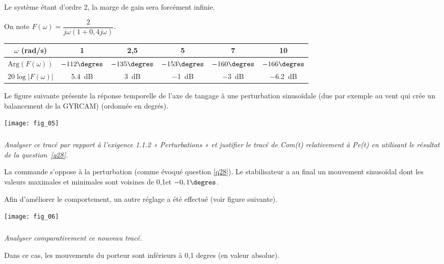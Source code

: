 \begin{multicols}{2}
\begin{corrige}
Le système étant d'ordre 2, la marge de gain sera forcément infinie.
\end{corrige}
\else

\footnotesize
On note $F(\omega)= \dfrac{2}{j\omega \left(1+0,4 j\omega \right)}$.
\begin{center}
\begin{tabular}{|c|c|c|c|c|c|}
\hline
$\omega$ (rad/s) & 1 & 2,5 & 5 & 7 & 10 \\ \hline
$\text{Arg}\left(F(\omega)\right)$  & $-112\degres$ & $-135\degres$ & $-153\degres$ & $-160\degres$ & $-166\degres$ \\ \hline
$20 \log \left| F(\omega)\right|$ & \SI{5,4}{dB} & \SI{3}{dB} & \SI{-1}{dB} & \SI{-3}{dB} & \SI{-6,2}{dB} \\ \hline
\end{tabular}
\end{center}
\normalsize

\fi

\ifprof
\else
Le figure suivante présente la réponse temporelle de l’axe de tangage à une perturbation sinusoïdale (due par
exemple au vent qui crée un balancement de la GYRCAM) (ordonnée en degrés).

\begin{center}
\texttt{[image: fig\_05]}
\end{center}
\fi

\subparagraph{}
\textit{Analyser ce tracé par rapport à l’exigence 1.1.2 « Perturbations » et justifier le
tracé de Com(t) relativement à Pe(t) en utilisant le résultat de la question~\ref{q28}.}
\ifprof
\begin{corrige}
La commande s'oppose à la perturbation (comme évoqué question \ref{q28}). Le stabilisateur a au final un mouvement sinusoïdal dont les valeurs maximales et minimales sont voisines de 0,1\degres et $-0,1\degres$. 
\end{corrige}
\else
\fi
\ifprof
\else
Afin d’améliorer le comportement, un autre réglage a été effectué (voir figure suivante).

\begin{center}
\texttt{[image: fig\_06]}
\end{center}
\fi


\subparagraph{}
\textit{Analyser comparativement ce nouveau tracé.}%
\ifprof
\begin{corrige}
Dans ce cas, les mouvements du porteur sont inférieurs à 0,1 degres (en valeur absolue).
\end{corrige}
\else
\fi



\end{multicols}

